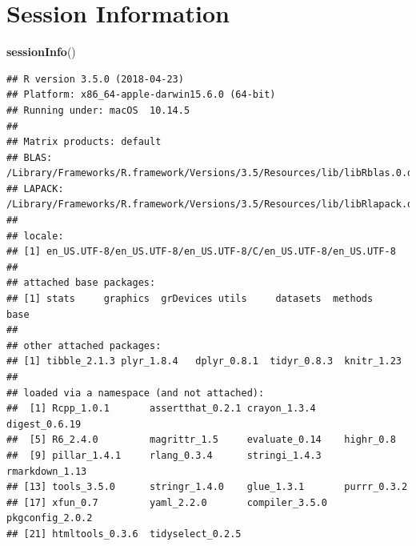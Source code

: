 \documentclass[]{article}
\newenvironment{Shaded}{\begin{snugshade}}{\end{snugshade}}
\newcommand{\KeywordTok}[1]{\textcolor[rgb]{0.13,0.29,0.53}{\textbf{#1}}}
\newcommand{\NormalTok}[1]{#1}
\begin{document}
\section{Session Information}\label{session-information}

\begin{Shaded}
\begin{Highlighting}[]
\KeywordTok{sessionInfo}\NormalTok{()}
\end{Highlighting}
\end{Shaded}

\begin{verbatim}
## R version 3.5.0 (2018-04-23)
## Platform: x86_64-apple-darwin15.6.0 (64-bit)
## Running under: macOS  10.14.5
## 
## Matrix products: default
## BLAS: /Library/Frameworks/R.framework/Versions/3.5/Resources/lib/libRblas.0.dylib
## LAPACK: /Library/Frameworks/R.framework/Versions/3.5/Resources/lib/libRlapack.dylib
## 
## locale:
## [1] en_US.UTF-8/en_US.UTF-8/en_US.UTF-8/C/en_US.UTF-8/en_US.UTF-8
## 
## attached base packages:
## [1] stats     graphics  grDevices utils     datasets  methods   base     
## 
## other attached packages:
## [1] tibble_2.1.3 plyr_1.8.4   dplyr_0.8.1  tidyr_0.8.3  knitr_1.23  
## 
## loaded via a namespace (and not attached):
##  [1] Rcpp_1.0.1       assertthat_0.2.1 crayon_1.3.4     digest_0.6.19   
##  [5] R6_2.4.0         magrittr_1.5     evaluate_0.14    highr_0.8       
##  [9] pillar_1.4.1     rlang_0.3.4      stringi_1.4.3    rmarkdown_1.13  
## [13] tools_3.5.0      stringr_1.4.0    glue_1.3.1       purrr_0.3.2     
## [17] xfun_0.7         yaml_2.2.0       compiler_3.5.0   pkgconfig_2.0.2 
## [21] htmltools_0.3.6  tidyselect_0.2.5
\end{verbatim}
\end{document}
